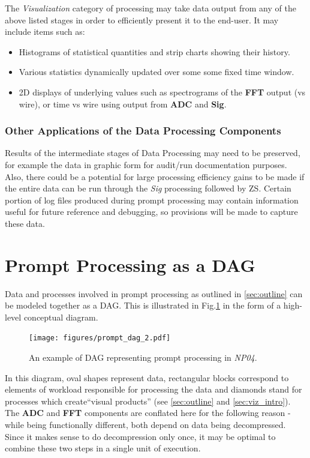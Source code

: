 \documentclass[pdftex,12pt,letter]{article}
\newcommand{\expname}{\textit{NP04}\xspace}
\begin{document}
The \textit{Visualization} category of processing
 may take data output from any of the above listed stages in
order to efficiently present it to the end-user. 
It may include items such as:

\begin{itemize}

\item Histograms of statistical quantities and strip charts showing their history.

\item Various statistics dynamically updated over some some fixed time window.

\item 2D displays of underlying values such as spectrograms of the \textbf{FFT}
  output (vs wire), or time vs wire using output from \textbf{ADC} and \textbf{Sig}.

\end{itemize}

\subsubsection{Other Applications of the Data Processing Components}
Results of the intermediate stages of Data Processing may need to be preserved, for example the data in graphic form for audit/run documentation purposes.
Also, there could be a potential for large processing efficiency
gains to be made if the entire data can be run through the \textit{Sig} processing followed by ZS. Certain portion of log files produced during prompt processing may contain information useful for future reference and debugging, so provisions will be made to capture these data.

\section{Prompt Processing as a DAG}
\label{sec:dag}
Data and processes involved in prompt processing as outlined in \ref{sec:outline} can be modeled together as a DAG. This is illustrated in Fig.\ref{fig:dag1} in the form of a high-level conceptual diagram.

\begin{figure}[tbh]
  \centering
  \texttt{[image: figures/prompt\_dag\_2.pdf]}
  \caption{An example of DAG representing prompt processing in \expname.}
  \label{fig:dag1}
\end{figure}
In this diagram, oval shapes represent data, rectangular blocks correspond to
elements of workload responsible for processing the data and diamonds stand for processes
which create``visual products'' (see \ref{sec:outline} and \ref{sec:viz_intro}).
The \textbf{ADC} and \textbf{FFT} components are conflated here for the following reason - while being functionally
different, both depend on data being decompressed. Since it makes sense to do decompression only once, it may
be optimal to combine these two steps in a single unit of execution.
\end{document}
